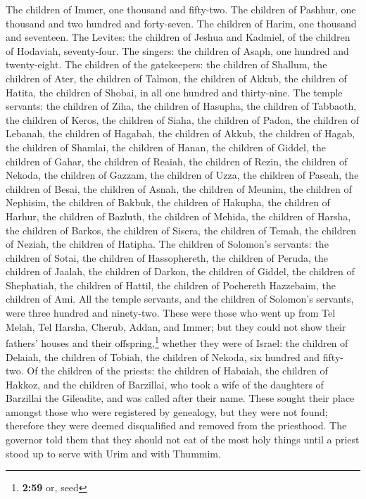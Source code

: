  The children of Immer, one thousand and fifty-two.
 The children of Pashhur, one thousand and two hundred
and forty-seven.  The children of Harim, one thousand and
seventeen.  The Levites: the children of Jeshua and
Kadmiel, of the children of Hodaviah, seventy-four.  The
singers: the children of Asaph, one hundred and twenty-eight.
 The children of the gatekeepers: the children of
Shallum, the children of Ater, the children of Talmon, the children of
Akkub, the children of Hatita, the children of Shobai, in all one
hundred and thirty-nine.  The temple servants: the
children of Ziha, the children of Hasupha, the children of Tabbaoth,
 the children of Keros, the children of Siaha, the
children of Padon,  the children of Lebanah, the children
of Hagabah, the children of Akkub,  the children of
Hagab, the children of Shamlai, the children of Hanan, 
the children of Giddel, the children of Gahar, the children of Reaiah,
 the children of Rezin, the children of Nekoda, the
children of Gazzam,  the children of Uzza, the children
of Paseah, the children of Besai,  the children of Asnah,
the children of Meunim, the children of Nephisim,  the
children of Bakbuk, the children of Hakupha, the children of Harhur,
 the children of Bazluth, the children of Mehida, the
children of Harsha,  the children of Barkos, the children
of Sisera, the children of Temah,  the children of
Neziah, the children of Hatipha.  The children of
Solomon's servants: the children of Sotai, the children of Hassophereth,
the children of Peruda,  the children of Jaalah, the
children of Darkon, the children of Giddel,  the children
of Shephatiah, the children of Hattil, the children of Pochereth
Hazzebaim, the children of Ami.  All the temple servants,
and the children of Solomon's servants, were three hundred and
ninety-two.  These were those who went up from Tel Melah,
Tel Harsha, Cherub, Addan, and Immer; but they could not show their
fathers' houses and their offspring,\footnote{\textbf{2:59} or, seed}
whether they were of Israel:  the children of Delaiah,
the children of Tobiah, the children of Nekoda, six hundred and
fifty-two.  Of the children of the priests: the children
of Habaiah, the children of Hakkoz, and the children of Barzillai, who
took a wife of the daughters of Barzillai the Gileadite, and was called
after their name.  These sought their place amongst those
who were registered by genealogy, but they were not found; therefore
they were deemed disqualified and removed from the priesthood.
 The governor told them that they should not eat of the
most holy things until a priest stood up to serve with Urim and with
Thummim.

